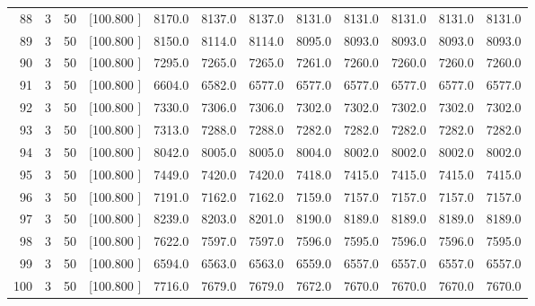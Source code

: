 \documentclass[12pt,a4paper]{article}
\begin{document}
\begin{center}
{\begin{tabular}{r r r r r r r r r r r r}
  88&  3& 50&[100.800   ]&  8170.0&  8137.0&  8137.0&  8131.0&  8131.0&  8131.0&  8131.0&  8131.0\\[-0.02in]
  89&  3& 50&[100.800   ]&  8150.0&  8114.0&  8114.0&  8095.0&  8093.0&  8093.0&  8093.0&  8093.0\\[-0.02in]
  90&  3& 50&[100.800   ]&  7295.0&  7265.0&  7265.0&  7261.0&  7260.0&  7260.0&  7260.0&  7260.0\\[-0.02in]
  91&  3& 50&[100.800   ]&  6604.0&  6582.0&  6577.0&  6577.0&  6577.0&  6577.0&  6577.0&  6577.0\\[-0.02in]
  92&  3& 50&[100.800   ]&  7330.0&  7306.0&  7306.0&  7302.0&  7302.0&  7302.0&  7302.0&  7302.0\\[-0.02in]
  93&  3& 50&[100.800   ]&  7313.0&  7288.0&  7288.0&  7282.0&  7282.0&  7282.0&  7282.0&  7282.0\\[-0.02in]
  94&  3& 50&[100.800   ]&  8042.0&  8005.0&  8005.0&  8004.0&  8002.0&  8002.0&  8002.0&  8002.0\\[-0.02in]
  95&  3& 50&[100.800   ]&  7449.0&  7420.0&  7420.0&  7418.0&  7415.0&  7415.0&  7415.0&  7415.0\\[-0.02in]
  96&  3& 50&[100.800   ]&  7191.0&  7162.0&  7162.0&  7159.0&  7157.0&  7157.0&  7157.0&  7157.0\\[-0.02in]
  97&  3& 50&[100.800   ]&  8239.0&  8203.0&  8201.0&  8190.0&  8189.0&  8189.0&  8189.0&  8189.0\\[-0.02in]
  98&  3& 50&[100.800   ]&  7622.0&  7597.0&  7597.0&  7596.0&  7595.0&  7596.0&  7596.0&  7595.0\\[-0.02in]
  99&  3& 50&[100.800   ]&  6594.0&  6563.0&  6563.0&  6559.0&  6557.0&  6557.0&  6557.0&  6557.0\\[-0.02in]
 100&  3& 50&[100.800   ]&  7716.0&  7679.0&  7679.0&  7672.0&  7670.0&  7670.0&  7670.0&  7670.0\\[-0.02in]

\hline
\end{tabular}}
\end{center}
\newpage
\end{document}
